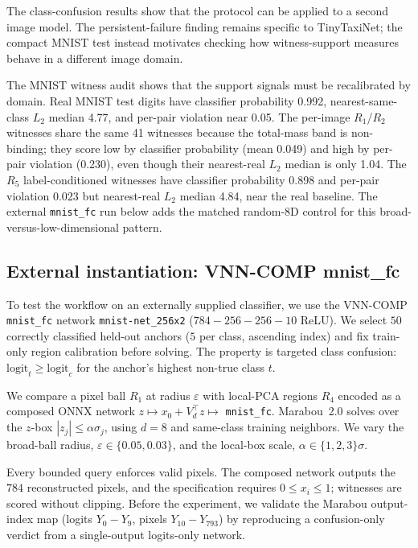 \documentclass[twocolumn,smallextended,runningheads]{svjour3}
\begin{document}
The class-confusion results show that the protocol can be applied to a second image model. The persistent-failure finding remains specific to TinyTaxiNet; the compact MNIST test instead motivates checking how witness-support measures behave in a different image domain.

The MNIST witness audit shows that the support signals must be recalibrated by domain. Real MNIST test digits have classifier probability 0.992, nearest-same-class $L_2$ median 4.77, and per-pair violation near 0.05. The per-image $R_1$/$R_2$ witnesses share the same 41 witnesses because the total-mass band is non-binding; they score low by classifier probability (mean 0.049) and high by per-pair violation (0.230), even though their nearest-real $L_2$ median is only 1.04. The $R_5$ label-conditioned witnesses have classifier probability 0.898 and per-pair violation 0.023 but nearest-real $L_2$ median 4.84, near the real baseline. The external \texttt{mnist\_fc} run below adds the matched random-8D control for this broad-versus-low-dimensional pattern.

\subsection{External instantiation: VNN-COMP mnist\_fc}
\label{sec:external_transfer}

To test the workflow on an externally supplied classifier, we use the VNN-COMP \texttt{mnist\_fc} network \texttt{mnist-net\_256x2} ($784{-}256{-}256{-}10$ ReLU). We select $50$ correctly classified held-out anchors ($5$ per class, ascending index) and fix train-only region calibration before solving. The property is targeted class confusion: $\mathrm{logit}_t \ge \mathrm{logit}_c$ for the anchor's highest non-true class $t$.

We compare a pixel ball $R_1$ at radius $\varepsilon$ with local-PCA regions $R_4$ encoded as a composed ONNX network $z \mapsto x_0 + V_d^\top z \mapsto$ \texttt{mnist\_fc}. Marabou~2.0 solves over the $z$-box $|z_j|\le\alpha\sigma_j$, using $d{=}8$ and same-class training neighbors. We vary the broad-ball radius, $\varepsilon \in \{0.05, 0.03\}$, and the local-box scale, $\alpha \in \{1,2,3\}\sigma$.

Every bounded query enforces valid pixels. The composed network outputs the $784$ reconstructed pixels, and the specification requires $0\le x_i\le1$; witnesses are scored without clipping. Before the experiment, we validate the Marabou output-index map (logits $Y_0\!-\!Y_9$, pixels $Y_{10}\!-\!Y_{793}$) by reproducing a confusion-only verdict from a single-output logits-only network.
\end{document}
